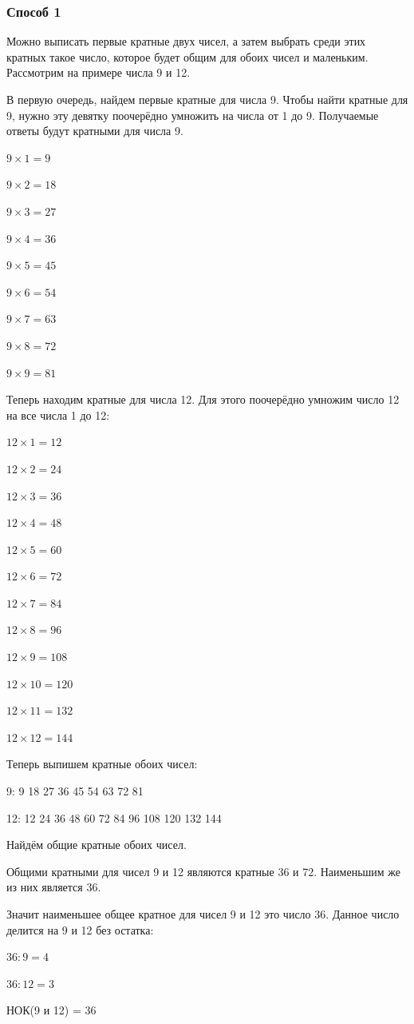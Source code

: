 \documentclass[12pt]{article}
\begin{document}
\subsubsection{Способ 1}
Можно выписать первые кратные двух чисел, а затем выбрать среди этих кратных такое число, которое будет общим для обоих чисел и маленьким. Рассмотрим на примере числа 9 и 12.\par
В первую очередь, найдем первые кратные для числа 9. Чтобы найти кратные для 9, нужно эту девятку поочерёдно умножить на числа от 1 до 9. Получаемые ответы будут кратными для числа 9.\par
$9 \times 1 = 9$\par
$9 \times 2 = 18$\par
$9 \times 3 = 27$\par
$9 \times 4 = 36$\par
$9 \times 5 = 45$\par
$9 \times 6 = 54$\par
$9 \times 7 = 63$\par
$9 \times 8 = 72$\par
$9 \times 9 = 81$\par
Теперь находим кратные для числа 12. Для этого поочерёдно умножим число 12 на все числа 1 до 12:\par
$12 \times 1 = 12$\par
$12 \times 2 = 24$\par
$12 \times 3 = 36$\par
$12 \times 4 = 48$\par
$12 \times 5 = 60$\par
$12 \times 6 = 72$\par
$12 \times 7 = 84$\par
$12 \times 8 = 96$\par
$12 \times 9 = 108$\par
$12 \times 10 = 120$\par
$12 \times 11 = 132$\par
$12 \times 12 = 144$\par
Теперь выпишем кратные обоих чисел:\par
9: 9 18 27 36 45 54 63 72 81\par
12: 12 24 36 48 60 72 84 96 108 120 132 144\par
Найдём общие кратные обоих чисел.\par
Общими кратными для чисел 9 и 12 являются кратные 36 и 72. Наименьшим же из них является 36.\par
Значит наименьшее общее кратное для чисел 9 и 12 это число 36. Данное число делится на 9 и 12 без остатка:\par
$36 : 9 = 4$\par
$36 : 12 = 3$\par
НОК(9 и 12) = 36\par
\end{document}
